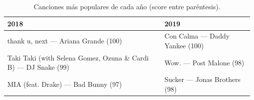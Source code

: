 \begin{table}[htbp]
\caption{Canciones más populares de cada año (score entre paréntesis).}
\label{tab:top}
\begin{tabular}{p{}p{}}
\toprule
2018 & 2019 \\
\midrule
thank u, next --- Ariana Grande (100) & Con Calma --- Daddy Yankee (100) \\
Taki Taki (with Selena Gomez, Ozuna \& Cardi B) --- DJ Snake (99) & Wow. --- Post Malone (98) \\
MIA (feat. Drake) --- Bad Bunny (97) & Sucker --- Jonas Brothers (98) \\
\bottomrule
\end{tabular}
\end{table}
